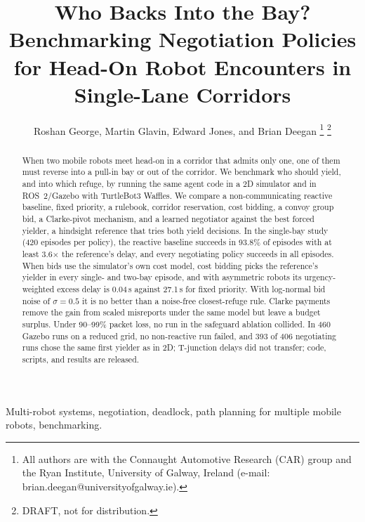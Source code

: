 \documentclass[letterpaper,journal]{IEEEtran}
\begin{document}
\title{Who Backs Into the Bay? Benchmarking Negotiation Policies for Head-On Robot Encounters in Single-Lane Corridors}
\author{Roshan George, Martin Glavin, Edward Jones, and Brian Deegan%
\thanks{All authors are with the Connaught Automotive Research (CAR) group and the Ryan Institute, University of Galway, Ireland (e-mail: brian.deegan@universityofgalway.ie).}%
\thanks{DRAFT, not for distribution.}}
\maketitle

\begin{abstract}
When two mobile robots meet head-on in a corridor that admits only one, one of them must reverse into a pull-in bay or out of the corridor. We benchmark who should yield, and into which refuge, by running the same agent code in a 2D simulator and in ROS~2/Gazebo with TurtleBot3 Waffles. We compare a non-communicating reactive baseline, fixed priority, a rulebook, corridor reservation, cost bidding, a convoy group bid, a Clarke-pivot mechanism, and a learned negotiator against the best forced yielder, a hindsight reference that tries both yield decisions. In the single-bay study (420 episodes per policy), the reactive baseline succeeds in 93.8\% of episodes with at least 3.6$\times$ the reference's delay, and every negotiating policy succeeds in all episodes. When bids use the simulator's own cost model, cost bidding picks the reference's yielder in every single- and two-bay episode, and with asymmetric robots its urgency-weighted excess delay is 0.04\,s against 27.1\,s for fixed priority. With log-normal bid noise of $\sigma=0.5$ it is no better than a noise-free closest-refuge rule. Clarke payments remove the gain from scaled misreports under the same model but leave a budget surplus. Under 90--99\% packet loss, no run in the safeguard ablation collided. In 460 Gazebo runs on a reduced grid, no non-reactive run failed, and 393 of 406 negotiating runs chose the same first yielder as in 2D; T-junction delays did not transfer; code, scripts, and results are released.
\end{abstract}

\begin{IEEEkeywords}
Multi-robot systems, negotiation, deadlock, path planning for multiple mobile robots, benchmarking.
\end{IEEEkeywords}
\end{document}
